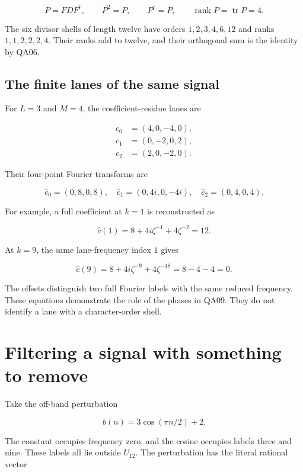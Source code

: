 \[
P=FDF^\dagger,
\qquad P^2=P,
\qquad P^\dagger=P,
\qquad \operatorname{rank}P=\operatorname{tr}P=4.
\]

The six divisor shells of length twelve have orders \(1,2,3,4,6,12\) and
ranks \(1,1,2,2,2,4\). Their ranks add to twelve, and their orthogonal
sum is the identity by QA06.

\hypertarget{the-finite-lanes-of-the-same-signal}{%
\subsection{The finite lanes of the same
signal}\label{the-finite-lanes-of-the-same-signal}}

For \(L=3\) and \(M=4\), the coefficient-residue lanes are

\[
\begin{aligned}
c_0&=(4,0,-4,0),\\
c_1&=(0,-2,0,2),\\
c_2&=(2,0,-2,0).
\end{aligned}
\]

Their four-point Fourier transforms are

\[
\widehat c_0=(0,8,0,8),
\quad \widehat c_1=(0,4i,0,-4i),
\quad \widehat c_2=(0,4,0,4).
\]

For example, a full coefficient at \(k=1\) is reconstructed as

\[
\widehat c(1)=8+4i\zeta^{-1}+4\zeta^{-2}=12.
\]

At \(k=9\), the same lane-frequency index \(1\) gives

\[
\widehat c(9)=8+4i\zeta^{-9}+4\zeta^{-18}=8-4-4=0.
\]

The offsets distinguish two full Fourier labels with the same reduced
frequency. These equations demonstrate the role of the phases in QA09.
They do not identify a lane with a character-order shell.

\hypertarget{filtering-a-signal-with-something-to-remove}{%
\section{Filtering a signal with something to
remove}\label{filtering-a-signal-with-something-to-remove}}

Take the off-band perturbation

\[
b(n)=3\cos(\pi n/2)+2.
\]

The constant occupies frequency zero, and the cosine occupies labels
three and nine. These labels all lie outside \(U_{12}\). The
perturbation has the literal rational vector


